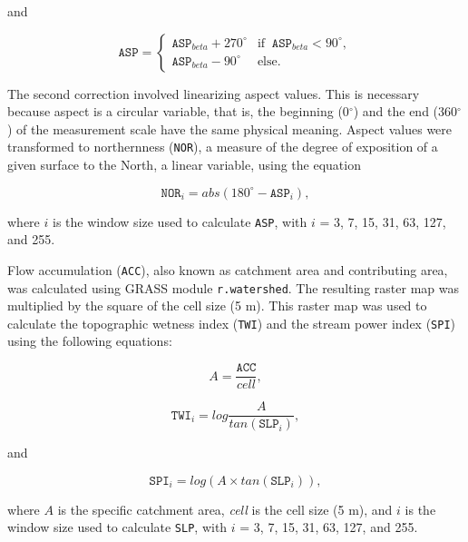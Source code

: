 \noindent and

\begin{equation}
  \texttt{ASP} =
  \begin{cases}
    \texttt{ASP}_{beta} + 270^\circ & \text{if}\;\; \texttt{ASP}_{beta} < 90^\circ, \\
    \texttt{ASP}_{beta} - 90^\circ  & \text{else}.
  \end{cases}
\end{equation}

\noindent The second correction involved linearizing aspect values. This is necessary because aspect is a circular variable, that is, the beginning (0$^\circ$) and the end (360$^\circ$) of the measurement scale have the same physical meaning. Aspect values were transformed to northernness (\texttt{NOR}), a measure of the degree of exposition of a given surface to the North, a linear variable, using the equation

\begin{equation}
  \texttt{NOR}_i = abs(180^\circ - \texttt{ASP}_i),
\end{equation}\label{eq:NOR}

\noindent where $i$ is the window size used to calculate \texttt{ASP}, with $i$ = 3, 7, 15, 31, 63, 127, and 255.   

Flow accumulation (\texttt{ACC}), also known as catchment area and contributing area, was calculated using GRASS module \texttt{r.watershed}. The resulting raster map was multiplied by the square of the cell size (5 m). This raster map was used to calculate the topographic wetness index (\texttt{TWI}) and the stream power index (\texttt{SPI}) using the following equations:

\begin{equation}
  A = \dfrac{\texttt{ACC}}{\textit{cell}},
\end{equation}\label{eq:sACC}

\begin{equation}
  \texttt{TWI}_i = log \dfrac{A}{tan(\texttt{SLP}_i)},
\end{equation}\label{eq:TWI}

\noindent and

\begin{equation}
  \texttt{SPI}_i = log(A \times tan(\texttt{SLP}_i)),
\end{equation}\label{eq:SPI}

\noindent where $A$ is the specific catchment area, \textit{cell} is the cell size (5 m), and $i$ is the window size used to calculate \texttt{SLP}, with $i$ = 3, 7, 15, 31, 63, 127, and 255.

